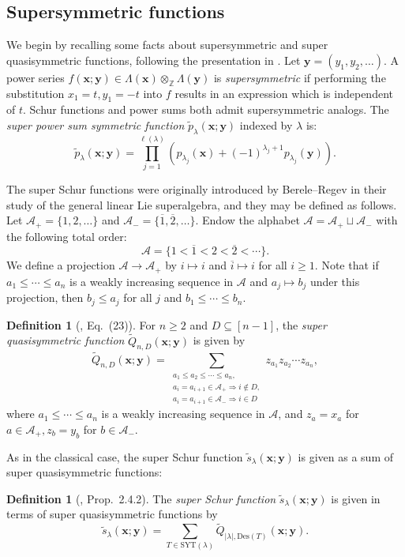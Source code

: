 \documentclass[11pt]{article}
\theoremstyle{definition}
\newtheorem{defi}[theo]{Definition}
\numberwithin{equation}{section}
\newcommand\ZZ{\mathbb{Z}}
\newcommand\Des{\mathrm{Des}}
\newcommand\SYT{\mathrm{SYT}}
\newcommand\xb{\mathbf{x}}
\newcommand\yb{\mathbf{y}}
\newcommand\Acal{\mathcal{A}}
\newcommand\Qtil{\widetilde{Q}}
\newcommand\ptil{\tilde{p}}
\newcommand\stil{\tilde{s}}
\begin{document}
\subsection{Supersymmetric functions}\label{sec:supersym-fxns}
We begin by recalling some facts about supersymmetric and super quasisymmetric functions, following the presentation in \cite{HHLRU}. Let $\yb = (y_1,y_2,\ldots)$. A power series $f(\xb;\yb) \in \Lambda(\xb) \otimes_\ZZ \Lambda(\yb)$ is \emph{supersymmetric} if performing the substitution $x_1 = t, y_1 = -t$ into $f$ results in an expression which is independent of $t$. Schur functions and power sums both admit supersymmetric analogs. The \emph{super power sum symmetric function} $\ptil_\lambda(\xb;\yb)$ indexed by $\lambda$ is:
\[
\ptil_\lambda(\xb;\yb) = \prod_{j=1}^{\ell(\lambda)} (p_{\lambda_j}(\xb) + (-1)^{\lambda_j+1}p_{\lambda_j}(\yb)).
\]

The super Schur functions were originally introduced by Berele--Regev \cite{BReg} in their study of the general linear Lie superalgebra, and they may be defined as follows. Let $\Acal_+ = \{ 1, 2, \ldots \}$ and $\Acal_- = \{ \overline{1}, \overline{2}, \ldots \}$. Endow the alphabet $\Acal = \Acal_+ \sqcup \Acal_-$ with the following total order:
\[
\Acal = \{ 1 < \overline{1} < 2 < \overline{2} < \cdots \}.
\]
We define a projection $\Acal \to \Acal_+$ by $i \mapsto i$ and $\overline{i} \mapsto i$ for all $i \ge 1$. Note that if $a_1 \le \cdots \le a_n$ is a weakly increasing sequence in $\Acal$ and $a_j \mapsto b_j$ under this projection, then $b_j \le a_j$ for all $j$ and $b_1 \le \cdots \le b_n$.
 
\begin{defi}[\cite{HHLRU}, Eq.~(23)]
For $n \ge 2$ and $D \subseteq [n-1]$, the \emph{super quasisymmetric function} $\Qtil_{n,D}(\xb;\yb)$ is given by
\[
\Qtil_{n,D}(\xb;\yb) = \sum_{\substack{a_1 \le a_2 \le \cdots \le a_n, \\ a_i = a_{i+1} \in \Acal_+ \Rightarrow i \not\in D, \\ a_i = a_{i+1} \in \Acal_- \Rightarrow i \in D}} z_{a_1} z_{a_2} \cdots z_{a_n},
\]
where $a_1 \le \cdots \le a_n$ is a weakly increasing sequence in $\Acal$, and $z_a = x_a$ for $a \in \Acal_+, z_b = y_b$ for $b \in \Acal_-$.
\end{defi}
As in the classical case, the super Schur function $\stil_\lambda(\xb;\yb)$ is given as a sum of super quasisymmetric functions:
\begin{defi}[\cite{HHLRU}, Prop.~2.4.2]\label{prop:super-s-to-q}
    The \emph{super Schur function} $\stil_\lambda(\xb;\yb)$ is given in terms of super quasisymmetric functions by
    \[
    \stil_\lambda(\xb;\yb) = \sum_{T \in \SYT(\lambda)} \Qtil_{|\lambda|,\Des(T)}(\xb;\yb).
    \]
\end{defi}
\end{document}
